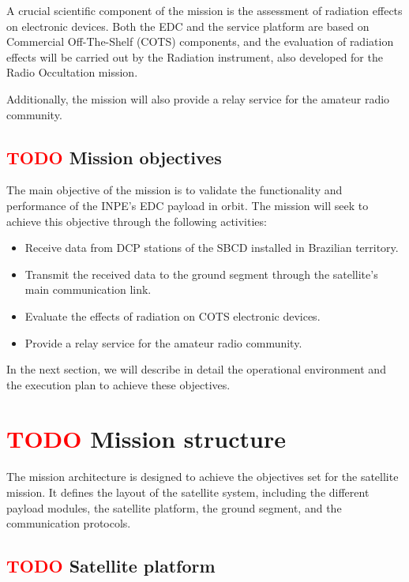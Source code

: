A crucial scientific component of the mission is the assessment of radiation effects on electronic devices. Both the EDC and the service platform are based on Commercial Off-The-Shelf (COTS) components, and the evaluation of radiation effects will be carried out by the Radiation instrument, also developed for the Radio Occultation mission.

Additionally, the mission will also provide a relay service for the amateur radio community.

\subsection{ \textcolor{red}{TODO} Mission objectives}

The main objective of the mission is to validate the functionality and performance of the INPE's EDC payload in orbit. The mission will seek to achieve this objective through the following activities:

\begin{itemize}
    \item Receive data from DCP stations of the SBCD installed in Brazilian territory.
    \item Transmit the received data to the ground segment through the satellite's main communication link.
    \item Evaluate the effects of radiation on COTS electronic devices.
    \item Provide a relay service for the amateur radio community.
\end{itemize}

In the next section, we will describe in detail the operational environment and the execution plan to achieve these objectives.

\section{ \textcolor{red}{TODO} Mission structure}


The mission architecture is designed to achieve the objectives set for the satellite mission. It defines the layout of the satellite system, including the different payload modules, the satellite platform, the ground segment, and the communication protocols.

\subsection{ \textcolor{red}{TODO} Satellite platform}

